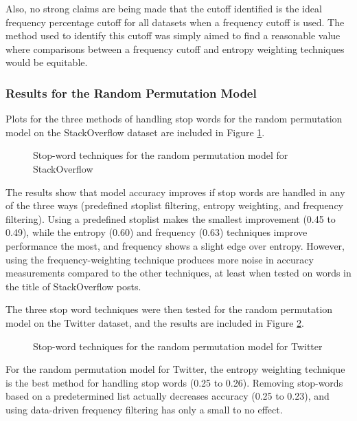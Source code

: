\documentclass[man,floatsintext,donotrepeattitle]{apa6}
\begin{document}
Also, no strong claims are being made that the cutoff identified is the ideal frequency percentage cutoff for all datasets when a frequency cutoff is used.
The method used to identify this cutoff was simply aimed to find a reasonable value where comparisons between a frequency cutoff and entropy weighting techniques would be equitable.

\subsubsection{Results for the Random Permutation Model}

Plots for the three methods of handling stop words for the random permutation model on the StackOverflow dataset are included in Figure \ref{figContextStopRPSO}.

\begin{figure}[!htbp]
  \caption{Stop-word techniques for the random permutation model for StackOverflow}
  \label{figContextStopRPSO}
\end{figure}

The results show that model accuracy improves if stop words are handled in any of the three ways (predefined stoplist filtering, entropy weighting, and frequency filtering).
Using a predefined stoplist makes the smallest improvement (\num{.45} to \num{.49}), while the entropy (\num{.60}) and frequency (\num{.63}) techniques improve performance the most,
and frequency shows a slight edge over entropy.
However, using the frequency-weighting technique produces more noise in accuracy measurements compared to the other techniques, at least when tested on words in the title of StackOverflow posts.

The three stop word techniques were then tested for the random permutation model on the Twitter dataset, and the results are included in Figure \ref{figContextStopRPT}.

\begin{figure}[!htbp]
  \caption{Stop-word techniques for the random permutation model for Twitter}
  \label{figContextStopRPT}
\end{figure}

For the random permutation model for Twitter, the entropy weighting technique is the best method for handling stop words (\num{.25} to \num{.26}).
Removing stop-words based on a predetermined list actually decreases accuracy (\num{.25} to \num{.23}), and using data-driven frequency filtering has only a small to no effect.
\end{document}
